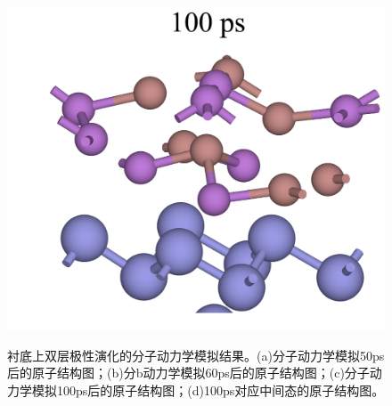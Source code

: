 \begin{figure}
{        \includegraphics{pic/IS_structure_2Linsb_md100ps.png}
        \label{fig:IS_structure_2Linsb_md100ps}
    }
    \caption{衬底上双层极性演化的分子动力学模拟结果。(a)分子动力学模拟50ps后的原子结构图；(b)分b动力学模拟60ps后的原子结构图；(c)分子动力学模拟100ps后的原子结构图；(d)100ps对应中间态的原子结构图。}
    \label{fig:IS_structure_2Linsb_md}
\end{figure}

